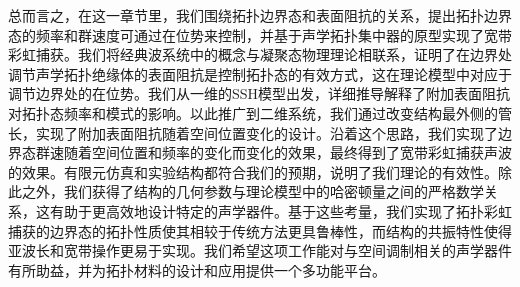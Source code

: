 总而言之，在这一章节里，我们围绕拓扑边界态和表面阻抗的关系，提出拓扑边界态的频率和群速度可通过在位势来控制，并基于声学拓扑集中器的原型实现了宽带彩虹捕获。我们将经典波系统中的概念与凝聚态物理理论相联系，证明了在边界处调节声学拓扑绝缘体的表面阻抗是控制拓扑态的有效方式，这在理论模型中对应于调节边界处的在位势。我们从一维的SSH模型出发，详细推导解释了附加表面阻抗对拓扑态频率和模式的影响。以此推广到二维系统，我们通过改变结构最外侧的管长，实现了附加表面阻抗随着空间位置变化的设计。沿着这个思路，我们实现了边界态群速随着空间位置和频率的变化而变化的效果，最终得到了宽带彩虹捕获声波的效果。有限元仿真和实验结构都符合我们的预期，说明了我们理论的有效性。除此之外，我们获得了结构的几何参数与理论模型中的哈密顿量之间的严格数学关系，这有助于更高效地设计特定的声学器件。基于这些考量，我们实现了拓扑彩虹捕获的边界态的拓扑性质使其相较于传统方法更具鲁棒性，而结构的共振特性使得亚波长和宽带操作更易于实现。我们希望这项工作能对与空间调制相关的声学器件有所助益，并为拓扑材料的设计和应用提供一个多功能平台。